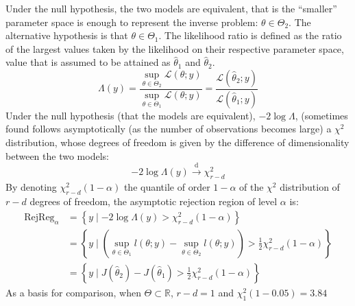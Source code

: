 \documentclass[../../Main_ManuscritThese.tex]{subfiles}
\begin{document}
Under the null hypothesis, the two models are equivalent, that is the ``smaller'' parameter space is enough to represent the inverse problem: $\theta \in \Theta_2$. The alternative hypothesis is that $\theta \in \Theta_1$.
The likelihood ratio is defined as the ratio of the largest values taken by the likelihood on their respective parameter space, value that is assumed to be attained as $\hat{\theta}_1$ and $\hat{\theta}_2$.
\begin{equation}
  \label{eq:def_lik_ratio}
  \Lambda(y) = \frac{\sup_{\theta \in \Theta_2} \mathcal{L}(\theta ; y)}{\sup_{\theta \in \Theta_1} \mathcal{L}(\theta ; y)} = \frac{\mathcal{L}(\hat{\theta}_2 ; y)}{\mathcal{L}(\hat{\theta}_1 ; y)}
\end{equation}
Under the null hypothesis (that the models are equivalent), $-2 \log \Lambda$, (sometimes found follows asymptotically (as the number of observations becomes large) a $\chi^2$ distribution, whose degrees of freedom is given by the difference of dimensionality between the two models:
\begin{equation}
  - 2 \log \Lambda(y) \xrightarrow[]{\mathrm{d}} \chi^2_{r-d}
\end{equation}
By denoting $\chi^2_{r-d}(1-\alpha)$ the quantile of order $1-\alpha$ of the $\chi^2$ distribution of $r-d$ degrees of freedom, the asymptotic rejection region of level $\alpha$ is:
\begin{align}
  \mathrm{RejReg}_{\alpha} &= \left\{y \mid -2 \log \Lambda(y) > \chi^2_{r-d}(1-\alpha) \right\} \label{eq:LRT_rej_reg}\\
                           &= \left\{ y \mid (\sup_{\theta\in\Theta_1} l(\theta;y) - \sup_{\theta\in\Theta_2} l(\theta;y)) > \frac12 \chi^2_{r-d}(1-\alpha) \right\} \\
                             &= \left\{ y \mid J(\hat{\theta}_2) - J(\hat{\theta}_1) >  \frac12 \chi^2_{r-d}(1-\alpha) \right\}
\end{align}
As a basis for comparison, when $\Theta \subset \mathbb{R}$, $r-d=1$ and $\chi^2_1(1-0.05) =3.84$ 
\end{document}
